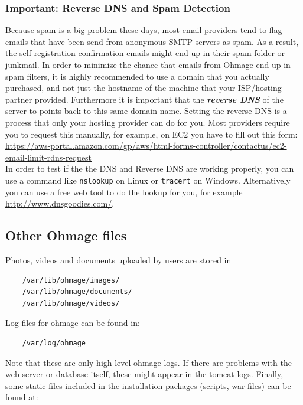 \documentclass{scrartcl}
\begin{document}
\subsubsection{Important: Reverse DNS and Spam Detection}

Because spam is a big problem these days, most email providers tend to flag
emails that have been send from anonymous SMTP servers as spam. As a result,
the self registration confirmation emails might end up in their spam-folder or
junkmail. In order to minimize the chance that emails from Ohmage end up in spam
filters, it is highly recommended to use a domain that you actually purchased,
and not just the hostname of the machine that your ISP/hosting partner provided.
Furthermore it is important that the \emph{\textbf{reverse DNS}} of the server
to points back to this same domain name. Setting the reverse DNS is a process
that only your hosting provider can do for you. Most providers require you to
request this manually, for example, on EC2 you have to fill out this form: \\

{\footnotesize\url{https://aws-portal.amazon.com/gp/aws/html-forms-controller/contactus/ec2-email-limit-rdns-request}}
\\



\noindent In order to test if the the DNS and Reverse DNS are working properly,
you can use a command like \texttt{nslookup} on Linux or \texttt{tracert} on
Windows. Alternatively you can use a free web tool to do the lookup for you,
for example \url{http://www.dnsgoodies.com/}.

 



\subsection{Other Ohmage files}

Photos, videos and documents uploaded by users are stored in

\begin{verbatim}
    /var/lib/ohmage/images/
    /var/lib/ohmage/documents/
    /var/lib/ohmage/videos/
\end{verbatim}
Log files for ohmage can be found in:

\begin{verbatim}
    /var/log/ohmage
\end{verbatim}

\noindent Note that these are only high level ohmage logs. If there are problems
with the web server or database itself, these might appear in the tomcat logs. 
Finally, some static files included in the installation packages (scripts,
war files) can be found at:
\end{document}
